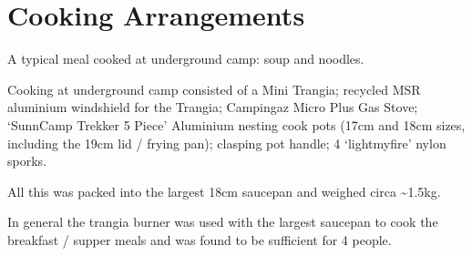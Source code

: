 \section{Cooking Arrangements}

\begin{marginfigure}
\checkoddpage \ifoddpage \forcerectofloat \else \forceversofloat \fi
\centering
 \caption{A typical meal cooked at underground camp: soup and noodles. }
 \label{soup noodles}
\end{marginfigure}

Cooking at underground camp consisted of a Mini Trangia; recycled MSR aluminium windshield for the Trangia; Campingaz Micro Plus Gas Stove; `SunnCamp Trekker 5 Piece' Aluminium nesting cook pots (17cm and 18cm sizes, including the 19cm lid / frying pan); clasping pot handle; 4 `lightmyfire' nylon sporks.

All this was packed into the largest 18cm saucepan and weighed circa \textasciitilde{}1.5kg.

In general the trangia burner was used with the largest saucepan to cook the breakfast / supper meals and was found to be sufficient for 4 people.

